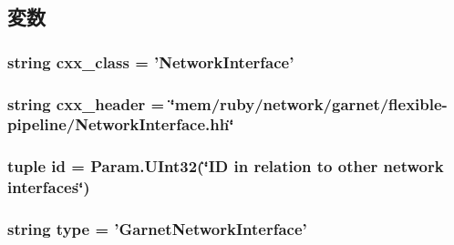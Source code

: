 \subsection{変数}
\hypertarget{classGarnetNetwork_1_1GarnetNetworkInterface_a58cd55cd4023648e138237cfc0822ae3}{
\subsubsection[{cxx\_\-class}]{\setlength{\rightskip}{0pt plus 5cm}string {\bf cxx\_\-class} = '{\bf NetworkInterface}'}}
\label{classGarnetNetwork_1_1GarnetNetworkInterface_a58cd55cd4023648e138237cfc0822ae3}
\hypertarget{classGarnetNetwork_1_1GarnetNetworkInterface_a17da7064bc5c518791f0c891eff05fda}{
\subsubsection[{cxx\_\-header}]{\setlength{\rightskip}{0pt plus 5cm}string {\bf cxx\_\-header} = \char`\"{}mem/ruby/network/garnet/flexible-\/pipeline/NetworkInterface.hh\char`\"{}}}
\label{classGarnetNetwork_1_1GarnetNetworkInterface_a17da7064bc5c518791f0c891eff05fda}
\hypertarget{classGarnetNetwork_1_1GarnetNetworkInterface_a0e43f6071072440917ee2dd8af07d251}{
\subsubsection[{id}]{\setlength{\rightskip}{0pt plus 5cm}tuple {\bf id} = Param.UInt32(\char`\"{}ID in relation to other network interfaces\char`\"{})}}
\label{classGarnetNetwork_1_1GarnetNetworkInterface_a0e43f6071072440917ee2dd8af07d251}
\hypertarget{classGarnetNetwork_1_1GarnetNetworkInterface_acce15679d830831b0bbe8ebc2a60b2ca}{
\subsubsection[{type}]{\setlength{\rightskip}{0pt plus 5cm}string {\bf type} = '{\bf GarnetNetworkInterface}'}}
